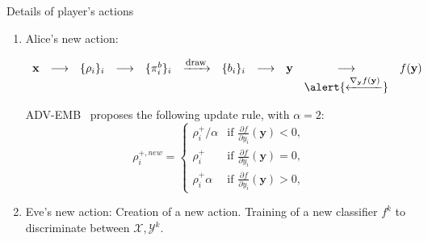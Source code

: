 \documentclass[10pt,aspectratio=169]{beamer}
\begin{document}
\begin{frame}{Details of player's actions}

    \begin{enumerate}

        \item \alert{Alice's new action:}

        \begin{equation*}
            \begin{array}{ccccccccccc}
                \mathbf{x} & \longrightarrow & \{\rho_i\}_i & \longrightarrow & \{\pi_i^b\}_i &   \xrightarrow{\mbox{\footnotesize{draw}}} & \{b_i\}_i &  \longrightarrow & \mathbf{y} & \longrightarrow  & f(\mathbf{y}) \\
                & & & & & & & & & \alert{\xleftarrow{ \nabla_{\mathbf{y}} f(\mathbf{y}) }} 
            \end{array}    
        \end{equation*}

        ADV-EMB~ proposes the following update rule, with $\alpha=2$:
        \begin{equation}
        \rho_{i}^{+, new} = 
        \left\{
            \begin{array}{ll}
                \rho_{i}^+/\alpha & \mbox{if } \frac{\partial f}{\partial y_{i}}\left(\mathbf{y}\right) < 0, \\
                \rho_{i}^+ & \mbox{if } \frac{\partial f}{\partial y_{i}}\left(\mathbf{y}\right) = 0, \\
                \rho_{i}^+ \alpha & \mbox{if } \frac{\partial f}{\partial y_{i}}\left(\mathbf{y}\right) > 0,
            \end{array}
        \right.
        \label{eq:qplus}
        \end{equation}

        \pause
        \item \alert{Eve's new action:} Creation of a new action. Training of a new classifier $f^k$ to discriminate between $\mathcal{X}, \mathcal{Y}^k$.

    \end{enumerate}

\end{frame}








\end{document}
